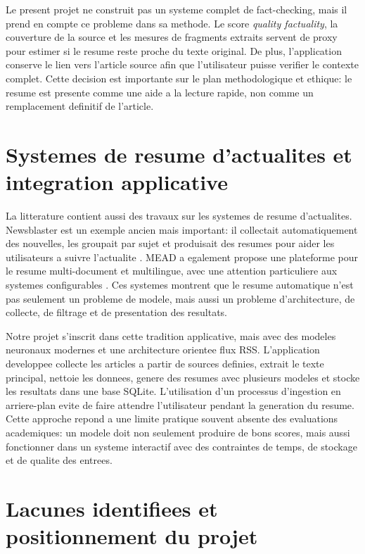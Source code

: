 Le present projet ne construit pas un systeme complet de fact-checking, mais il prend en compte ce probleme dans sa methode. Le score \textit{quality factuality}, la couverture de la source et les mesures de fragments extraits servent de proxy pour estimer si le resume reste proche du texte original. De plus, l'application conserve le lien vers l'article source afin que l'utilisateur puisse verifier le contexte complet. Cette decision est importante sur le plan methodologique et ethique: le resume est presente comme une aide a la lecture rapide, non comme un remplacement definitif de l'article.

\section{Systemes de resume d'actualites et integration applicative}

La litterature contient aussi des travaux sur les systemes de resume d'actualites. Newsblaster est un exemple ancien mais important: il collectait automatiquement des nouvelles, les groupait par sujet et produisait des resumes pour aider les utilisateurs a suivre l'actualite \cite{McKeown2002Newsblaster}. MEAD a egalement propose une plateforme pour le resume multi-document et multilingue, avec une attention particuliere aux systemes configurables \cite{Radev2004MEAD}. Ces systemes montrent que le resume automatique n'est pas seulement un probleme de modele, mais aussi un probleme d'architecture, de collecte, de filtrage et de presentation des resultats.

Notre projet s'inscrit dans cette tradition applicative, mais avec des modeles neuronaux modernes et une architecture orientee flux RSS. L'application developpee collecte les articles a partir de sources definies, extrait le texte principal, nettoie les donnees, genere des resumes avec plusieurs modeles et stocke les resultats dans une base SQLite. L'utilisation d'un processus d'ingestion en arriere-plan evite de faire attendre l'utilisateur pendant la generation du resume. Cette approche repond a une limite pratique souvent absente des evaluations academiques: un modele doit non seulement produire de bons scores, mais aussi fonctionner dans un systeme interactif avec des contraintes de temps, de stockage et de qualite des entrees.

\section{Lacunes identifiees et positionnement du projet}

